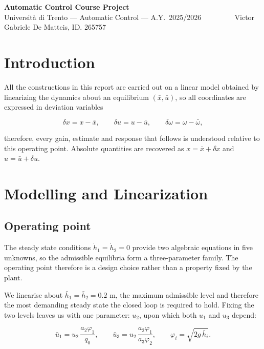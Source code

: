 \documentclass[10pt,a4paper]{scrartcl}
\newcommand{\RuleSection}[1]{%
\section{#1}%
\vspace{0.2em}{\color{accent!35}\hrule height 0.4pt}\vspace{0.3em}%
}
\begin{document}

\begin{center}
{\Large\bfseries\color{accent} Automatic Control Course Project}\\[0.25cm]
{\small Università di Trento --- Automatic Control --- A.Y.\ 2025/2026 $\qquad\qquad$}
{\small Victor Gabriele De Matteis, ID. 265757}\\[0.2cm]
\end{center}




\RuleSection{Introduction}
\label{sec:intro}

All the constructions in this report are carried out on a linear model obtained by linearizing the dynamics about an equilibrium $(\bar x, \bar u)$, so all coordinates are expressed in deviation variables 

$$\delta x = x - \bar x, \qquad \delta u = u - \bar u, \qquad \delta\omega = \omega - \bar\omega,$$

therefore, every gain, estimate and response that follows is understood relative to this operating point. 
Absolute quantities are recovered as  $x = \bar x + \delta x$ and $u = \bar u + \delta u$.

\RuleSection{Modelling and Linearization}
\label{sec:q1}

\subsection{Operating point}

The steady state conditions $\dot h_1 = \dot h_2=0$ provide two algebraic equations in five unknowns, so the admissible equilibria form a three-parameter family. The operating point therefore is a design choice rather than a property fixed by the plant. 

We linearise about $\bar h_1 = \bar h_2 = 0.2$ m, the maximum admissible level and therefore the most demanding steady state the closed loop is required to hold. 
Fixing the two levels leaves us with one parameter: $u_2$, upon which both $u_1$ and $u_3$ depend:

\begin{equation}
    \bar u_1=u_2\,\frac{a_2\varphi_1}{q_0},\qquad
    \bar u_3=u_2\,\frac{a_2\varphi_1}{a_3\varphi_2},\qquad
    \varphi_i=\sqrt{2g\,\bar h_i}.
    \label{eq:q1_balance}
\end{equation}
\end{document}
